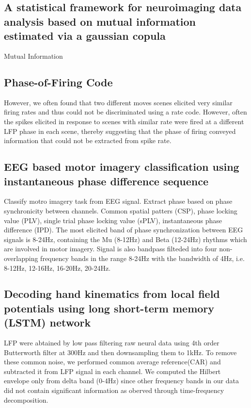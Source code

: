 \documentclass[8pt,a4paper]{article}
\begin{document}
\subsection*{A statistical framework for neuroimaging data analysis based on mutual information estimated via a gaussian copula}
\label{A statistical framework for neuroimaging data analysis based on mutual information estimated via a gaussian copula}
Mutual Information \cite{ince2017}

\subsection*{Phase-of-Firing Code}
\label{Phase-of-Firing Code}
However, we often found that two different moves scenes elicited very similar firing rates and thus could not be discriminated using a rate code. 
However, often the spikes elicited in response to scenes with similar rate were fired at a different LFP phase in each scene, 
thereby suggesting that the phase of firing conveyed information that could not be extracted from spike rate.
\cite{cattani2015}

\subsection*{EEG based motor imagery classification using instantaneous phase difference sequence}
\label{sec:EEG based motor imagery classification using instantaneous phase difference sequence}
Classify motro imagery task from EEG signal. Extract phase based on phase synchronicity between channels. 
Common spatial patters (CSP), phase locking value (PLV), single trial phase locking value (sPLV), instantaneous phase difference (IPD). 
The most elicited band of phase synchronization between EEG signals is 8-24Hz, containing the Mu (8-12Hz) and Beta (12-24Hz) rhythms which are involved in motor imagery. 
Signal is also bandpass filteded into four non-overlapping frequency bands in the range 8-24Hz with the bandwidth of 4Hz, i.e. 8-12Hz, 12-16Hz, 16-20Hz, 20-24Hz.
\cite{kumar2018}


\subsection*{Decoding hand kinematics from local field potentials using long short-term memory (LSTM) network}
\label{sec:Decoding hand kinematics from local field potentials using long short-term memory (LSTM) network}
LFP were abtained by low pass filtering raw neural data using 4th order Butterworth filter at 300Hz and then downsampling them to 1kHz. 
To remove these common noise, we performed common average reference(CAR) and subtracted it from LFP signal in each channel. 
We computed the Hilbert envelope only from delta band (0-4Hz) since other frequency bands in our data did not contain significant information as oberved through time-frequency decomposition. \cite{ahmadi2019}
\end{document}
